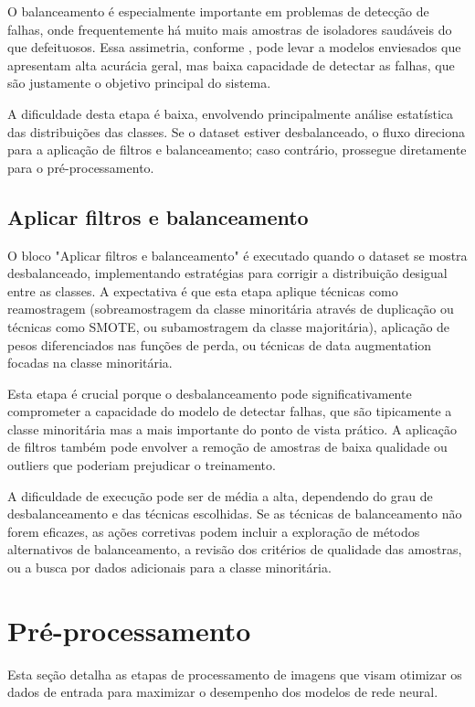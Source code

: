 O balanceamento é especialmente importante em problemas de detecção de falhas, onde frequentemente há muito mais amostras de isoladores saudáveis do que defeituosos. Essa assimetria, conforme , pode levar a modelos enviesados que apresentam alta acurácia geral, mas baixa capacidade de detectar as falhas, que são justamente o objetivo principal do sistema.

A dificuldade desta etapa é baixa, envolvendo principalmente análise estatística das distribuições das classes. Se o dataset estiver desbalanceado, o fluxo direciona para a aplicação de filtros e balanceamento; caso contrário, prossegue diretamente para o pré-processamento.

\subsection{Aplicar filtros e balanceamento}
O bloco "Aplicar filtros e balanceamento" é executado quando o dataset se mostra desbalanceado, implementando estratégias para corrigir a distribuição desigual entre as classes. A expectativa é que esta etapa aplique técnicas como reamostragem (sobreamostragem da classe minoritária através de duplicação ou técnicas como SMOTE, ou subamostragem da classe majoritária), aplicação de pesos diferenciados nas funções de perda, ou técnicas de data augmentation focadas na classe minoritária.

Esta etapa é crucial porque o desbalanceamento pode significativamente comprometer a capacidade do modelo de detectar falhas, que são tipicamente a classe minoritária mas a mais importante do ponto de vista prático. A aplicação de filtros também pode envolver a remoção de amostras de baixa qualidade ou outliers que poderiam prejudicar o treinamento.

A dificuldade de execução pode ser de média a alta, dependendo do grau de desbalanceamento e das técnicas escolhidas. Se as técnicas de balanceamento não forem eficazes, as ações corretivas podem incluir a exploração de métodos alternativos de balanceamento, a revisão dos critérios de qualidade das amostras, ou a busca por dados adicionais para a classe minoritária.

\section{Pré-processamento}

Esta seção detalha as etapas de processamento de imagens que visam otimizar os dados de entrada para maximizar o desempenho dos modelos de rede neural.

